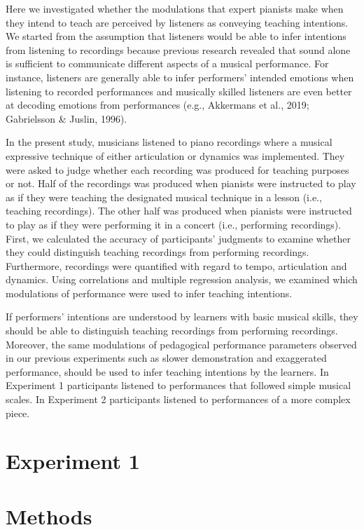 \documentclass[
  man,floatsintext]{apa6}
\begin{document}
Here we investigated whether the modulations that expert pianists make when they intend to teach are perceived by listeners as conveying teaching intentions. We started from the assumption that listeners would be able to infer intentions from listening to recordings because previous research revealed that sound alone is sufficient to communicate different aspects of a musical performance. For instance, listeners are generally able to infer performers' intended emotions when listening to recorded performances and musically skilled listeners are even better at decoding emotions from performances (e.g., Akkermans et al., 2019; Gabrielsson \& Juslin, 1996).

In the present study, musicians listened to piano recordings where a musical expressive technique of either articulation or dynamics was implemented. They were asked to judge whether each recording was produced for teaching purposes or not. Half of the recordings was produced when pianists were instructed to play as if they were teaching the designated musical technique in a lesson (i.e., teaching recordings). The other half was produced when pianists were instructed to play as if they were performing it in a concert (i.e., performing recordings). First, we calculated the accuracy of participants' judgments to examine whether they could distinguish teaching recordings from performing recordings. Furthermore, recordings were quantified with regard to tempo, articulation and dynamics. Using correlations and multiple regression analysis, we examined which modulations of performance were used to infer teaching intentions.

If performers' intentions are understood by learners with basic musical skills, they should be able to distinguish teaching recordings from performing recordings. Moreover, the same modulations of pedagogical performance parameters observed in our previous experiments such as slower demonstration and exaggerated performance, should be used to infer teaching intentions by the learners. In Experiment 1 participants listened to performances that followed simple musical scales. In Experiment 2 participants listened to performances of a more complex piece.

\hypertarget{experiment-1}{%
\section{Experiment 1}\label{experiment-1}}

\hypertarget{methods}{%
\section{Methods}\label{methods}}
\end{document}
